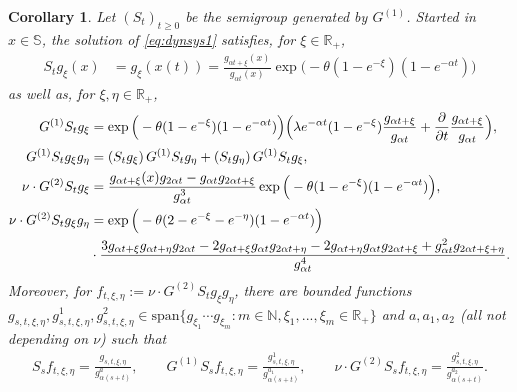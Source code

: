 \documentclass{imsart}
\theoremstyle{plain}
\newtheorem{corollary}[theorem]{Corollary}
\theoremstyle{definition}
\begin{document}
\begin{corollary}\label{cor2.4}
  Let $(S_t)_{t\geq 0}$ be the semigroup generated by $G^{(1)}$. Started in $x \in \mathbb S$, the solution of \eqref{eq:dynsys1} satisfies, for $\xi \in \mathbb R_+$, 
\begin{equation}
\label{eq:sol2}
\begin{aligned}
  S_t g_{\xi}(x) & = g_{\xi}(x(t)) = \frac{g_{\alpha t + \xi}(x)}{g_{\alpha t}(x)}
  \exp\Big(-\theta(1-e^{- \xi})(1-e^{-\alpha t})\Big)
\end{aligned}
\end{equation}
as well as, for $\xi, \eta \in \mathbb R_+$,
\begin{align}
    \label{eq:sol3}
    G^{(1)}S_t g_{\xi} & = \exp\Big(-\theta(1-e^{- \xi})(1-e^{-\alpha t})\Big)\Big(\lambda e^{-\alpha t}(1 - e^{-\xi})\frac{g_{\alpha  t + \xi}}{g_{\alpha t}} + \frac{\partial}{\partial t} \frac{g_{\alpha  t + \xi}}{g_{\alpha t}}\Big), \\ \label{eq:sol32}
    G^{(1)}S_t g_{\xi} g_{\eta} & = (S_t g_{\xi})\, G^{(1)}S_t g_{\eta} + (S_t g_{ \eta})\, G^{(1)}S_t g_{ \xi}, \\ 
    \label{eq:sol4}
    \nu \cdot G^{(2)}S_t g_{ \xi} & = 
    \frac{g_{\alpha  t + \xi}(x)g_{2\alpha t} - g_{\alpha t} g_{2\alpha t+\xi}}{g_{\alpha t}^3}\exp\Big(-\theta(1-e^{-\xi})(1-e^{-\alpha t})\Big), \\
    \nu \cdot G^{(2)}S_t g_{\xi} g_{\eta}  & = \exp\Big(-\theta(2-e^{-\xi} - e^{- \eta})(1-e^{-\alpha t})\Big) \notag \\ 
    \label{eq:sol42} &  \cdot 
    \frac{
    3g_{\alpha t + \xi} g_{\alpha  t + \eta}g_{2\alpha t} - 2 g_{\alpha  t + \xi} g_{\alpha t}g_{2\alpha t + \eta} - 2 g_{\alpha t + \eta} g_{\alpha t} g_{2\alpha t+\xi} + g_{\alpha t}^2 g_{2\alpha t+\xi+\eta}}{g_{\alpha t}^4}. 
\end{align}
Moreover, for $f_{t,\xi,\eta} := \nu \cdot G^{(2)}S_t g_{\xi} g_{\eta}$, there are bounded functions $g_{s, t, \xi, \eta}, g^1_{s, t, \xi, \eta}, g^2_{s, t, \xi, \eta} \in \text{span} \{g_{\xi_1} \cdots g_{\xi_m}: m \in \mathbb N, \xi_1,...,\xi_m \in \mathbb R_+ \}$ and $a, a_1, a_2$ (all not depending on $\nu$) such that 
\begin{align}
    \label{eq:morebounds}
    S_s f_{t,\xi, \eta} = \frac{g_{s,t,\xi, \eta}}{g_{\alpha (s+t)}^{a}}, \qquad G^{(1)} S_s f_{t,\xi, \eta} = \frac{g^1_{s,t,\xi, \eta}}{g_{\alpha (s+t)}^{a_1}}, \qquad \nu \cdot G^{(2)} S_s f_{t,\xi, \eta} = \frac{g^2_{s,t,\xi, \eta}}{g_{\alpha (s+t)}^{a_2}}.
\end{align}
\end{corollary}
\end{document}
